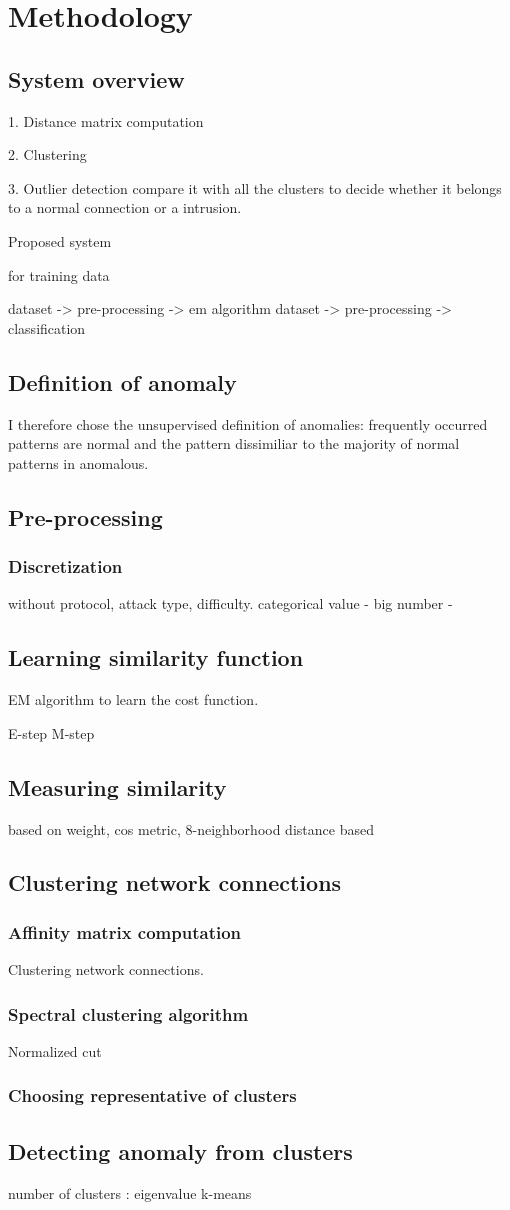 \section{Methodology}
\subsection{System overview}
1. Distance matrix computation

2. Clustering

3. Outlier detection
compare it with all the clusters to decide whether it belongs to a normal connection or a intrusion.

Proposed system

for training data

dataset -> pre-processing -> em algorithm
dataset -> pre-processing -> classification

\subsection{Definition of anomaly}
I therefore chose the unsupervised definition of 
anomalies:
frequently occurred patterns are normal
and the pattern dissimiliar to the majority 
of normal patterns in anomalous.

\subsection{Pre-processing}
\subsubsection{Discretization}
without protocol, attack type, difficulty.
categorical value - 
big number - 

\subsection{Learning similarity function}
EM algorithm to learn the cost function.

E-step
M-step

\subsection{Measuring similarity}
based on weight, cos metric, 8-neighborhood
distance based 

\subsection{Clustering network connections}
\subsubsection{Affinity matrix computation}
Clustering network connections.

\subsubsection{Spectral clustering algorithm}
Normalized cut

\subsubsection{Choosing representative of clusters}

\subsection{Detecting anomaly from clusters}
number of clusters : eigenvalue
k-means

